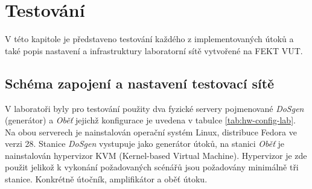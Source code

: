 \chapter{Testování}
\label{chap:testovani}
V této kapitole je představeno testování každého z implementovaných útoků a také popis nastavení a infrastruktury laboratorní sítě vytvořené na FEKT VUT.

\section{Schéma zapojení a nastavení testovací sítě}
V laboratoři byly pro testování použity dva fyzické servery pojmenované \textit{DoSgen} (generátor) a \textit{Oběť} jejichž konfigurace je uvedena v tabulce \ref{tab:hw-config-lab}. Na obou serverech je nainstalován operační systém Linux, distribuce Fedora ve verzi 28. Stanice \textit{DoSgen} vystupuje jako generátor útoků, na stanici \textit{Oběť} je nainstalován hypervizor KVM (Kernel-based Virtual Machine). Hypervizor je zde použit jelikož k vykonání požadovaných scénářů jsou požadovány minimálně tři stanice. Konkrétně útočník, amplifikátor a oběť útoku.

